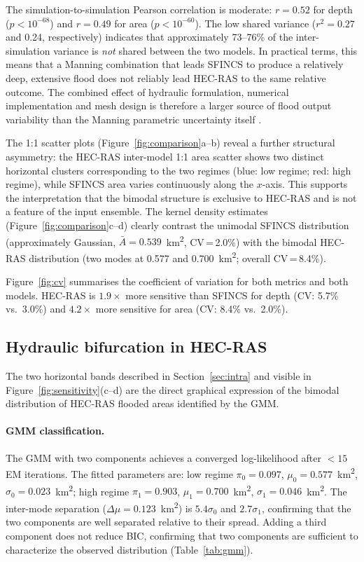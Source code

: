 \documentclass[review,12pt]{elsarticle}
\newcommand{\sfincs}{\textsc{SFINCS}}
\newcommand{\hecras}{\textsc{HEC-RAS}}
\begin{document}
The simulation-to-simulation Pearson correlation is moderate:
$r = 0.52$ for depth ($p < 10^{-68}$) and $r = 0.49$ for area
($p < 10^{-60}$).
The low shared variance ($r^2 = 0.27$ and 0.24, respectively) indicates
that approximately 73--76\% of the inter-simulation variance is \emph{not}
shared between the two models.
In practical terms, this means that a Manning combination that leads
\sfincs{} to produce a relatively deep, extensive flood does not
reliably lead \hecras{} to the same relative outcome.
The combined effect of hydraulic formulation, numerical implementation
and mesh design is therefore a larger source of
flood output variability than the Manning parametric uncertainty itself
\citep{liu2019, vandaele2024}.

The 1:1 scatter plots (Figure~\ref{fig:comparison}a--b) reveal a further
structural asymmetry: the \hecras{} inter-model 1:1 area scatter shows two
distinct horizontal clusters corresponding to the two regimes
(blue: low regime; red: high regime), while \sfincs{} area varies
continuously along the $x$-axis.
This supports the interpretation that the bimodal structure is exclusive to \hecras{} and is
not a feature of the input ensemble.
The kernel density estimates (Figure~\ref{fig:comparison}c--d) clearly
contrast the unimodal \sfincs{} distribution (approximately Gaussian,
$\bar{A} = 0.539$~km\textsuperscript{2}, CV\,=\,2.0\%) with the bimodal
\hecras{} distribution (two modes at 0.577 and 0.700~km\textsuperscript{2};
overall CV\,=\,8.4\%).

Figure~\ref{fig:cv} summarises the coefficient of variation for both metrics
and both models. \hecras{} is $1.9\times$ more sensitive than \sfincs{} for
depth (CV: 5.7\% vs.\ 3.0\%) and $4.2\times$ more sensitive for area
(CV: 8.4\% vs.\ 2.0\%).

\subsection{Hydraulic bifurcation in HEC-RAS}
\label{sec:bifurcation}

The two horizontal bands described in Section~\ref{sec:intra} and visible in
Figure~\ref{fig:sensitivity}(c--d) are the direct graphical expression of
the bimodal distribution of \hecras{} flooded areas identified by the GMM.

\paragraph{GMM classification.}
The GMM with two components achieves a converged log-likelihood after
$< 15$ EM iterations.
The fitted parameters are: low regime $\pi_0 = 0.097$,
$\mu_0 = 0.577$~km\textsuperscript{2},
$\sigma_0 = 0.023$~km\textsuperscript{2};
high regime $\pi_1 = 0.903$,
$\mu_1 = 0.700$~km\textsuperscript{2},
$\sigma_1 = 0.046$~km\textsuperscript{2}.
The inter-mode separation ($\Delta\mu = 0.123$~km\textsuperscript{2})
is $5.4\sigma_0$ and $2.7\sigma_1$, confirming that the two components
are well separated relative to their spread.
Adding a third component does not reduce BIC, confirming that two components
are sufficient to characterize the observed distribution
(Table~\ref{tab:gmm}).
\end{document}
